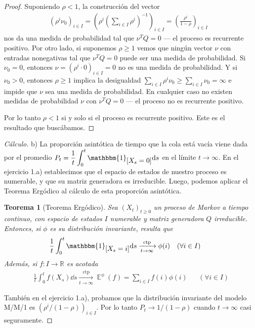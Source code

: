 \documentclass{article}
\DeclareMathOperator{\Exp}{\mathbb{E}}
\newcommand{\realnum}{\mathbb{R}}
\newcommand{\characteristic}{\mathbbm{1}}
\newcommand{\almostSurely}{\text{ctp}}
\newtheorem{theorem}{Teorema}
\theoremstyle{definition}
\begin{document}
\begin{proof}
Suponiendo \(\rho < 1\), la construcción del vector 
\begin{align}
	\left( \rho^i \nu_0 \right)_{i \in I}
	=
	\left( \rho^i \left(\sum_{i \in I} \rho^i\right)^{- 1} \right)_{i \in I}
	=
	\left( \frac{\rho^i}{1 - \rho} \right)_{i \in I}
\end{align}
nos da una medida de probabilidad tal que \(\nu^T Q = 0\) --- el proceso es recurrente positivo.
Por otro lado, si suponemos \(\rho \geq 1\) vemos que ningún vector \(\nu\) con entradas nonegativas tal que \(\nu^T Q = 0\) puede ser una medida de probabilidad.
Si \(\nu_0 = 0\), entonces \(\nu = (\rho^i \cdot 0)_{i \in I} = 0\) no es una medida de probabilidad.
Y si \(\nu_0 > 0\), entonces \(\rho \geq 1\) implica la desigualdad \(\sum_{i \in I} \rho^i \nu_0 \geq \sum_{i \in I} \nu_0 = \infty\) e impide que \(\nu\) sea una medida de probabilidad.
En cualquier caso no existen medidas de probabilidad \(\nu\) con \(\nu^T Q = 0\) --- el proceso no es recurrente positivo.

Por lo tanto \(\rho < 1\) si y solo si el proceso es recurrente positivo.
Este es el resultado que buscábamos.
\end{proof}

\begin{proof}[Cálculo] b)
La proporción asintótica de tiempo que la cola está vacía viene dada por el promedio \(P_t = {\displaystyle \frac{1}{t} \int_0^t \characteristic_{\displaystyle [X_s = 0]} \dd s}\) en el límite \(t \rightarrow \infty\).
En el ejercicio 1.a) establecimos que el espacio de estados de nuestro proceso es numerable, y que su matriz generadora es irreducible.
Luego, podemos aplicar el Teorema Ergódico al cálculo de esta proporción asintótica. 
\begin{theorem}[Teorema Ergódico]
\label{theorem:ErgodicTheoremForMarkovProcesses}
Sea \((X_t)_{t \geq 0}\) un proceso de Markov a tiempo continuo, con espacio de estados \(I\) numerable y matriz generadora \(Q\) irreducible.
Entonces, si \(\phi\) es su distribución invariante, resulta que
\begin{align}
	&\frac{1}{t} \int_0^t \characteristic_{\displaystyle [X_s = i]} \dd s
	\xrightarrow[t \rightarrow \infty]{\almostSurely}
	\phi(i)
	&&(\forall i \in I)
\end{align}
Además, si \(f : I \rightarrow \realnum\) es acotada
\begin{align}
	&\frac{1}{t} \int_0^t f(X_s) \dd s
	\xrightarrow[t \rightarrow \infty]{\almostSurely}
	\Exp^{\phi}(f) = \sum_{i \in I} f(i) \phi(i)
	&&(\forall i \in I)
\end{align}
\end{theorem}
También en el ejercicio 1.a), probamos que la distribución invariante del modelo M/M/1 es \((\rho^i / (1 - \rho))_{i \in I}\).
Por lo tanto \(P_t \rightarrow 1 / (1 - \rho)\) cuando \(t \rightarrow \infty\) casi seguramente.
\end{proof}
\end{document}
